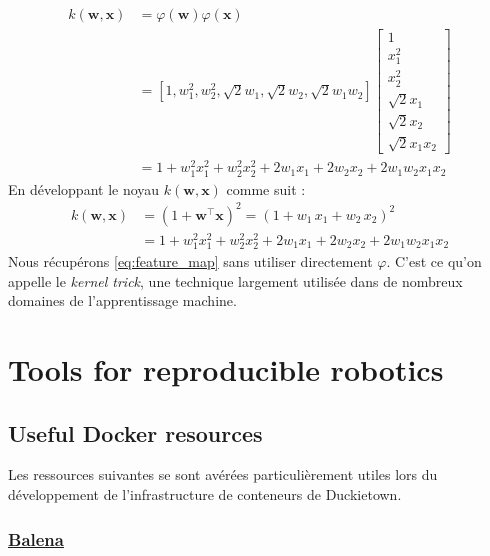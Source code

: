 {\begin{align}\label{eq:feature_map}
    k(\mathbf w, \mathbf x) &= \varphi(\mathbf w) \varphi(\mathbf x) \\
    &=[1, w_1^2, w_2^2, \sqrt{2} w_1, \sqrt{2} w_2, \sqrt{2} w_1 w_2]\begin{bmatrix}
                                                                                   1\\ x_1^2\\ x_2^2\\ \sqrt{2} x_1\\ \sqrt{2} x_2\\ \sqrt{2} x_1 x_2
    \end{bmatrix}\\
    & = \boxed{1 + w_1^2 x_1^2 + w_2^2 x_2^2 + 2 w_1 x_1 + 2 w_2 x_2 + 2 w_1 w_2 x_1 x_2}
\end{align}
%
En développant le noyau $k(\mathbf w, \mathbf x)$ comme suit :
%
\begin{align}
k(\mathbf w, \mathbf x) & = (1 + \mathbf w^\intercal \mathbf x)^2 = (1 + w_1 \, x_1 + w_2 \, x_2)^2 \\
& = \boxed{1 + w_1^2 x_1^2 + w_2^2 x_2^2 + 2 w_1 x_1 + 2 w_2 x_2 + 2 w_1 w_2 x_1 x_2}
\end{align}
%
Nous récupérons \autoref{eq:feature_map} sans utiliser directement $\varphi$. C'est ce qu'on appelle le \textit{kernel trick}, une technique largement utilisée dans de nombreux domaines de l'apprentissage machine.

\chapter{Tools for reproducible robotics}

\section{Useful Docker resources}

Les ressources suivantes se sont avérées particulièrement utiles lors du développement de l'infrastructure de conteneurs de Duckietown.

\subsection{\href{https://www.balena.io/}{Balena}}\label{subsec:balena}

}
